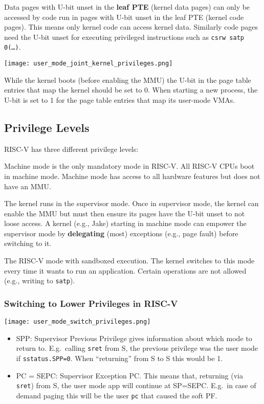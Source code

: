 Data pages with U-bit unset in the \textbf{leaf PTE} (kernel data pages) can only be accessed by code run in pages with U-bit unset in the leaf PTE (kernel code pages). This means only kernel code can access kernel data. Similarly code pages need the U-bit unset for executing privileged instructions such as \texttt{csrw satp 0(\dots)}.

\texttt{[image: user\_mode\_joint\_kernel\_privileges.png]}

While the kernel boots (before enabling the MMU) the U-bit in the page table entries that map the kernel should be set to 0. When starting a new process, the U-bit is set to 1 for the page table entries that map its user-mode VMAs.

\subsection{Privilege Levels}

RISC-V has three different privilege levels:

\newpar{}

Machine mode is the only mandatory mode in RISC-V. All RISC-V CPUs boot in machine mode. Machine mode has access to all hardware features but does not have an MMU.

\newpar{}

The kernel runs in the supervisor mode. Once in supervisor mode, the kernel can enable the MMU but must then ensure its pages have the U-bit unset to not loose access. A kernel (e.g., Jake) starting in machine mode can
empower the supervisor mode by \textbf{delegating} (most) exceptions (e.g., page fault) before switching to it.

\newpar{}

The RISC-V mode with sandboxed execution. The kernel switches to this mode every time it wants to run an application. Certain operations are not allowed (e.g., writing to \texttt{satp}).

\subsubsection{Switching to Lower Privileges in RISC-V}

\texttt{[image: user\_mode\_switch\_privileges.png]}

\newpar{}
\begin{itemize}
    \item SPP: Supervisor Previous Privilege gives information about which mode to return to. E.g.\ calling \texttt{sret} from S, the previous privilege was the user mode if \texttt{sstatus.SPP=0}. When ``returning'' from S to S this would be 1.
    \item PC = SEPC: Supervisor Exception PC. This means that, returning (via \texttt{sret}) from S, the user mode app will continue at SP=SEPC. E.g.\ in case of demand paging this will be the user \texttt{pc} that caused the soft PF.
\end{itemize}


